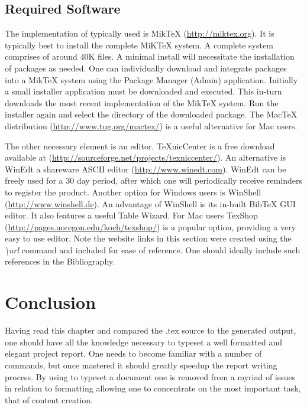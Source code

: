 \subsection{Required Software}
The implementation of \latex typically used is MikTeX (\url{http://miktex.org}). It is typically best to install the complete MiKTeX  system. A complete system comprises of around 40K files. A minimal install will necessitate the installation of packages as needed. One can individually download and integrate packages into a MikTeX system using the Package Manager (Admin) application. Initially a small installer application must be downloaded and executed. This in-turn downloads the most recent implementation of the MikTeX system. Run the installer again and select the directory of the downloaded package. The MacTeX distribution (\url{http://www.tug.org/mactex/}) is a useful alternative for Mac users. 

The other necessary element is an editor. TeXnicCenter is a free download available at (\url{http://sourceforge.net/projects/texniccenter/}). An alternative is WinEdt a shareware ASCII editor (\url{http://www.winedt.com}). WinEdt can be freely used for a 30 day period, after which one will periodically receive reminders to register the product. Another option for Windows users is WinShell (\url{http://www.winshell.de}). An advantage of WinShell is its in-built BibTeX GUI editor. It also features a useful Table Wizard. For Mac users TexShop (\url{http://pages.uoregon.edu/koch/texshop/}) is a popular option, providing a very easy to use editor. Note the website links in this section were created using the \emph{\textbackslash url} command and included for ease of reference. One should ideally include such references in the Bibliography.  

\section{Conclusion}
Having read this chapter and compared the .tex source to the generated output, one should have all the knowledge necessary to typeset a well formatted and elegant project report. One needs to become familiar with a number of commands, but once mastered it should greatly speedup the report writing process. By using \latex to typeset a document one is removed from a myriad of issues in relation to formatting allowing one to concentrate on the most important task, that of content creation. 
